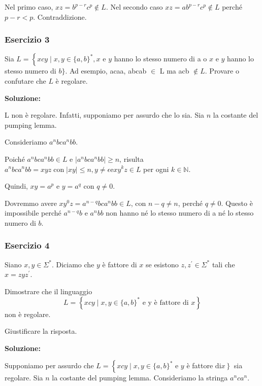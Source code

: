 Nel primo caso, $x z=b^{p-r}c^{p} \notin L$. Nel secondo caso $x z=a b^{p-r}c^{p} \notin L$ perché $p-r<p$. Contraddizione.

\subsubsection{Esercizio 3}

Sia $L=\left\{x c y \mid x, y \in\{a, b\}^{*}, x\right.$ e $y$ hanno lo stesso numero di a o $x$ e $y$ hanno lo stesso numero di $b\}$.
Ad esempio, acaa, abcab $\in$ L ma acb $\notin L$.
Provare o confutare che $L$ è regolare.

\vspace{5mm}

\textbf{Soluzione:}

L non è regolare. Infatti, supponiamo per assurdo che lo sia. Sia $n$ la costante del pumping lemma.

Consideriamo $a^{n} b c a^{n} b b$.

Poiché $a^{n} b c a^{n} b b \in L$ e $\left|a^{n} b c a^{n} b b\right| \geq n$, risulta $a^{n} b c a^{n} b b=x y z \operatorname{con}|x y| \leq n, y \neq \epsilon \mathrm{e} x y^{k} z \in L$ per ogni $k \in \mathbb{N}$.

Quindi, $x y=a^{p}$ e $y=a^{q}$ con $q \neq 0$.

Dovremmo avere $x y^{0} z=a^{n-q} b c a^{n} b b \in L$, con $n-q \neq n$, perché $q \neq 0$.
Questo è impossibile perché $a^{n-q} b$ e $a^{n} b b$ non hanno né lo stesso numero di a né lo stesso numero di $b$.

\subsubsection{Esercizio 4}

Siano $x, y \in \Sigma^{*}$. Diciamo che $y$ è fattore di $x$ se esistono $z, z^{\prime} \in \Sigma^{*}$ tali che $x=z y z^{\prime}$.

Dimostrare che il linguaggio
$$
L=\left\{x c y \mid x, y \in\{a, b\}^{*} \text { e y è fattore di } x\right\}
$$
non è regolare.

Giustificare la risposta.

\vspace{5mm}

\textbf{Soluzione:}

Supponiamo per assurdo che $L=\left\{x c y \mid x, y \in\{a, b\}^{*}\right.$ e $y$ è fattore $\left.\mathrm{di} x\right\}$ sia regolare. Sia $n$ la costante del pumping lemma. Consideriamo la stringa $a^{n} c a^{n}$.

